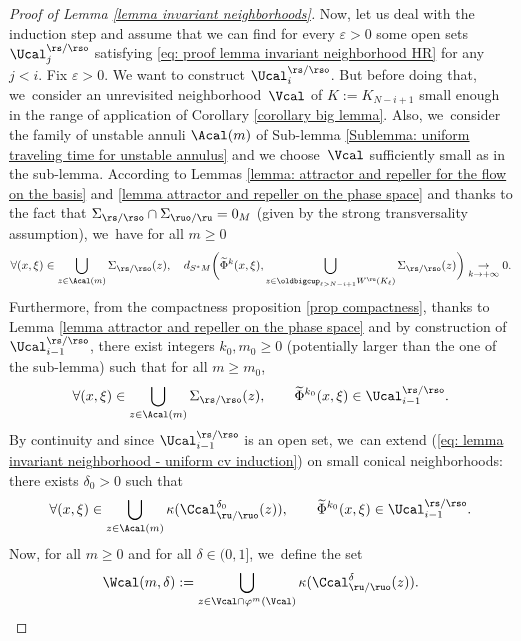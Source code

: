\begin{proof}[Proof of Lemma \ref{lemma invariant neighborhoods}]
Now, let us deal with the induction step and assume that we can find for every $\varepsilon > 0$ some open sets $\Ucal_{j}^{\rs/\rso}$ satisfying \eqref{eq: proof lemma invariant neighborhood HR} for any $j < i$. Fix $\varepsilon > 0$. We want to construct $\Ucal_{i}^{\rs/\rso}$. But before doing that, we~consider an unrevisited neighborhood~$\Vcal$ of $K:= K_{N-i+1}$ small enough in the range of application of Corollary \ref{corollary big lemma}. Also, we~consider the family of unstable annuli $\Acal (m)$ of Sub-lemma \ref{Sublemma: uniform traveling time for unstable annulus} and we choose~$\Vcal$ sufficiently small as in the sub-lemma. According to Lemmas \ref{lemma: attractor and repeller for the flow on the basis} and \ref{lemma attractor and repeller on the phase space} and thanks to the fact that $\Sigma_{\rs/\rso}\cap \Sigma_{\ruo/\ru} = 0_M$ (given by the strong transversality assumption), we~have for all $m \geq 0$
\[
\forall (x,\xi) \in \bigcup_{z \in \Acal (m)} \Sigma_{\rs/\rso} (z), \quad d_{S^* M}\biggl(\widetilde{\Phi}^k (x,\xi), \bigcup_{z \in \oldbigcup_{\ell > N-i +1} W^\ru (K_\ell)} \Sigma_{\rs/\rso} (z) \biggr) \underset{k \to +\infty}{\to}0.
\]
Furthermore, from the compactness proposition \ref{prop compactness}, thanks to Lemma \ref{lemma attractor and repeller on the phase space} and by construction of $\Ucal_{i-1}^{\rs/\rso}$, there exist integers $k_0, m_0 \geq 0$ (potentially larger than the one of the sub-lemma) such that for all $m \geq m_0$,
\begin{equation}\label{eq: lemma invariant neighborhood - uniform cv induction}
\forall (x,\xi) \in \bigcup_{z \in \Acal (m)} \Sigma_{\rs/\rso} (z), \qquad \widetilde{\Phi}^{k_0} (x,\xi) \in \Ucal_{i-1}^{\rs/\rso}.
\end{equation}
By continuity and since $\Ucal_{i-1}^{\rs/\rso}$ is an open set, we~can extend (\ref{eq: lemma invariant neighborhood - uniform cv induction}) on small conical neighborhoods: there exists $\delta_0 > 0$ such that
\[
\forall (x,\xi) \in \bigcup_{z \in \Acal (m)} \kappa (\Ccal_{\ru/\ruo}^{\delta_0}(z)), \qquad \widetilde{\Phi}^{k_0} (x,\xi) \in \Ucal_{i-1}^{\rs/\rso}.
\]
Now, for all $m \geq 0$ and for all $\delta\in(0,1]$, we~define the set
\[
\Wcal (m,\delta):= \bigcup_{z \in \Vcal \cap \varphi^m (\Vcal)} \kappa (\Ccal_{\ru/\ruo}^{\delta}(z)).
\]


\end{proof}
